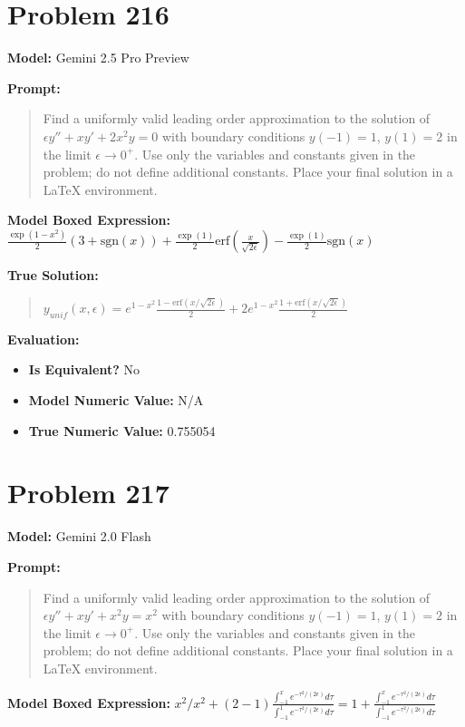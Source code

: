 \documentclass{article}
\begin{document}
{\section*{Problem 216}
\textbf{Model:} Gemini 2.5 Pro Preview

\textbf{Prompt:}
\begin{quote}
Find a uniformly valid leading order approximation to the solution of $\epsilon y'' + x y' + 2x^2 y = 0$ with boundary conditions $y(-1) = 1$, $y(1) = 2$ in the limit $\epsilon \to 0^+$. Use only the variables and constants given in the problem; do not define additional constants. Place your final solution in a $\boxed{}$ LaTeX environment.
\end{quote}
\textbf{Model Boxed Expression:} $\frac{\exp(1-x^2)}{2}(3+\text{sgn}(x)) + \frac{\exp(1)}{2}\text{erf}\left(\frac{x}{\sqrt{2\epsilon}}\right) - \frac{\exp(1)}{2}\text{sgn}(x)$

\textbf{True Solution:}
\begin{quote}
$y_{unif}(x, \epsilon) = e^{1-x^2} \frac{1-\text{erf}(x/\sqrt{2\epsilon})}{2} + 2e^{1-x^2} \frac{1+\text{erf}(x/\sqrt{2\epsilon})}{2}$
\end{quote}

\textbf{Evaluation:}
\begin{itemize}
\item \textbf{Is Equivalent?} No
\item \textbf{Model Numeric Value:} N/A
\item \textbf{True Numeric Value:} 0.755054
\end{itemize}
\vspace{1cm}
\section*{Problem 217}
\textbf{Model:} Gemini 2.0 Flash

\textbf{Prompt:}
\begin{quote}
Find a uniformly valid leading order approximation to the solution of $\epsilon y'' + x y' + x^2 y = x^2$ with boundary conditions $y(-1) = 1$, $y(1) = 2$ in the limit $\epsilon \to 0^+$. Use only the variables and constants given in the problem; do not define additional constants. Place your final solution in a $\boxed{}$ LaTeX environment.
\end{quote}
\textbf{Model Boxed Expression:} $x^2/x^2 + (2-1) \frac{\int_{-1}^x e^{-\tau^2/(2\epsilon)} d\tau}{\int_{-1}^1 e^{-\tau^2/(2\epsilon)} d\tau} = 1 + \frac{\int_{-1}^x e^{-\tau^2/(2\epsilon)} d\tau}{\int_{-1}^1 e^{-\tau^2/(2\epsilon)} d\tau}$

}
\end{document}
